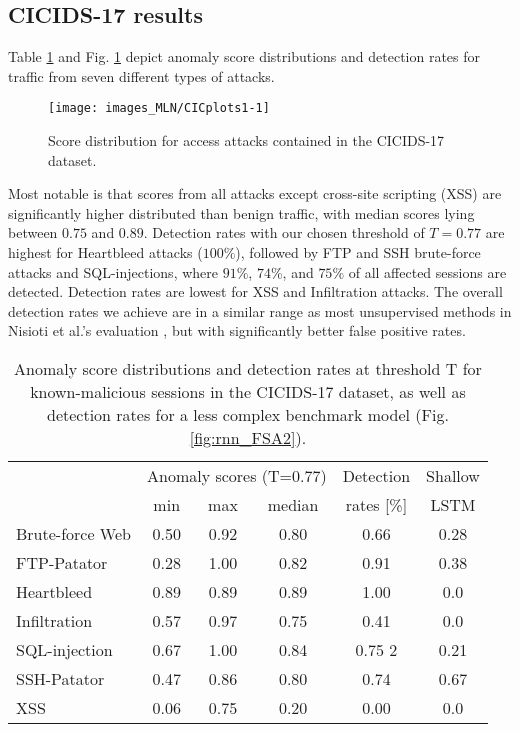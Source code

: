 \subsection{CICIDS-17 results}\label{Sec:DetCIC}


Table \ref{tab:dfCICinf} and Fig. \ref{fig:CICplots1} 
depict anomaly score distributions and detection rates for traffic from seven different types of attacks.


\begin{figure}[ht]
\begin{center}
\texttt{[image: images\_MLN/CICplots1-1]} 
\vspace{-0.5cm}
\caption[Score distribution for various access attacks contained in the CICIDS-17 dataset, along with our detection threshold]{Score distribution for access attacks contained in the CICIDS-17 dataset.}\label{fig:CICplots1}
\end{center}
\end{figure}

Most notable is that scores from all attacks except cross-site scripting (XSS) are significantly higher distributed than benign traffic, with median scores lying between $0.75$ and $0.89$. Detection rates with our chosen threshold of $T=0.77$ are highest for Heartbleed attacks ($100\%$), followed by FTP and SSH brute-force attacks and SQL-injections, where $91\%$, $74\%$, and $75\%$ of all affected sessions are detected. Detection rates are lowest for XSS and Infiltration attacks. The overall detection rates we achieve are in a similar range as most unsupervised methods in Nisioti et al.'s evaluation \cite{nisioti2018intrusion}, but with significantly better false positive rates.


\begin{table}[ht]
\centering
\begin{tabular}{l|ccc||c|c}
\multicolumn{1}{c|}{ }&\multicolumn{3}{c||}{Anomaly scores (T=0.77)}&Detection&Shallow\\
 &  min  &  max  &  median  & rates [\%] & LSTM\\ 
  \hline
Brute-force Web & 0.50 & 0.92 & 0.80 & 0.66  &0.28 \\ 
  FTP-Patator & 0.28 & 1.00 & 0.82 & 0.91 & 0.38\\ 
  Heartbleed & 0.89 & 0.89 & 0.89 & 1.00 & 0.0\\ 
  Infiltration &0.57& 0.97& 0.75&0.41 &0.0\\ 
  SQL-injection & 0.67 & 1.00 & 0.84 & 0.75 2&0.21\\ 
  SSH-Patator & 0.47 & 0.86 & 0.80 & 0.74 &0.67\\ 
  XSS & 0.06 & 0.75 & 0.20 & 0.00 &0.0\\ 
   \hline
\end{tabular}
\vspace{2pt}
\caption{Anomaly score distributions and detection rates at threshold T for known-malicious sessions in the CICIDS-17 dataset, as well as detection rates for a less complex benchmark model (Fig. \ref{fig:rnn_FSA2}).}
\label{tab:dfCICinf}
\end{table}

